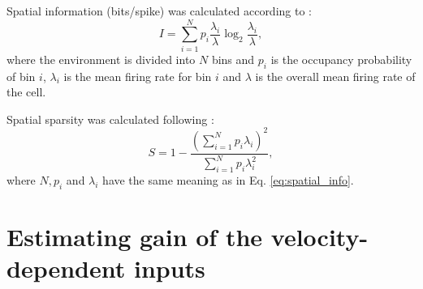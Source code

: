 \documentclass[a4paper,12pt]{article}
\begin{document}
Spatial information (bits/spike) was calculated according to
\citep{Skaggs:1996du}:
\begin{equation}
    I = \sum_{i = 1}^N p_i \frac{\lambda_i}{\lambda} \log_2 \frac{\lambda_i}{\lambda},
    \label{eq:spatial_info}
\end{equation}
where the environment is divided into $N$ bins and $p_i$ is the
occupancy probability of bin $i$, $\lambda_i$ is the mean firing rate for bin
$i$ and $\lambda$ is the overall mean firing rate of the cell.

Spatial sparsity was calculated following \citep{Buetfering:2014gu}:
\begin{equation}
    S = 1 - \frac{\left(\displaystyle \sum_{i = 1}^N p_i
    \lambda_i\right)^2}{\displaystyle \sum_{i = 1}^N p_i \lambda_i^2},
    \label{eq:spatial_sparsity}
\end{equation}
where $N, p_i$ and $\lambda_i$ have the same meaning as in Eq.
\eqref{eq:spatial_info}.


\section{Estimating gain of the velocity-dependent inputs} \label{sec:gain_est}
\end{document}
